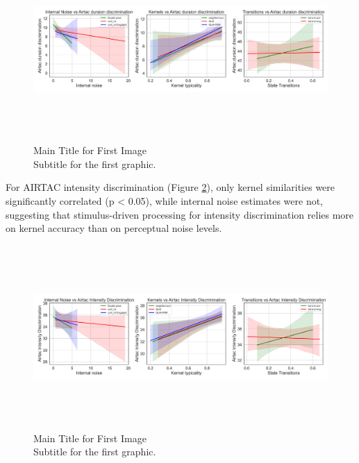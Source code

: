 \begin{figure}[H]
    \centering
    \includegraphics[width=17cm,height=7cm]{MainLayout/Images/chapter8/regression_results_airtac_dur_discr.jpg}
    \caption{Main Title for First Image \\ \small Subtitle for the first graphic.}
    \label{fig:regression_results_airtac_dur_discr}
\end{figure}
For AIRTAC intensity discrimination (Figure \ref{fig:regression_results_airtac_int_discr}), only kernel similarities were significantly correlated (p < 0.05), while internal noise estimates were not, suggesting that stimulus-driven processing for intensity discrimination relies more on kernel accuracy than on perceptual noise levels.
\begin{figure}[H]
    \centering
    \includegraphics[width=17cm,height=7cm]{MainLayout/Images/chapter8/regression_results_airtac_int_discr.jpg}
    \caption{Main Title for First Image \\ \small Subtitle for the first graphic.}
    \label{fig:regression_results_airtac_int_discr}
\end{figure}
